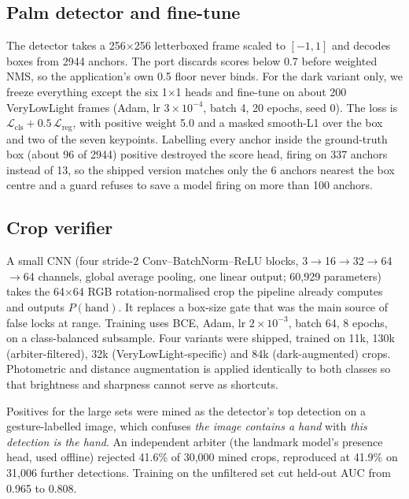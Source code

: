 \documentclass[conference,a4paper]{IEEEtran}
\begin{document}
\subsection{Palm detector and fine-tune}
The detector takes a 256$\times$256 letterboxed frame scaled to $[-1,1]$
and decodes boxes from 2944 anchors. The port discards scores below 0.7
before weighted NMS, so the application's own 0.5 floor never binds. For
the dark variant only, we freeze everything except the six 1$\times$1 heads
and fine-tune on about 200 VeryLowLight frames (Adam, lr $3\times10^{-4}$,
batch 4, 20 epochs, seed 0). The loss is
$\mathcal{L}_{\text{cls}} + 0.5\,\mathcal{L}_{\text{reg}}$, with positive
weight 5.0 and a masked smooth-L1 over the box and two of the seven
keypoints. Labelling every anchor inside the ground-truth box (about 96 of
2944) positive destroyed the score head, firing on 337 anchors instead of
13, so the shipped version matches only the 6 anchors nearest the box centre
and a guard refuses to save a model firing on more than 100 anchors.

\subsection{Crop verifier}
A small CNN (four stride-2 Conv--BatchNorm--ReLU blocks,
3$\to$16$\to$32$\to$64$\to$64 channels, global average pooling, one linear
output; 60,929 parameters) takes the 64$\times$64 RGB rotation-normalised
crop the pipeline already computes and outputs $P(\text{hand})$. It
replaces a box-size gate that was the main source of false locks at range.
Training uses BCE, Adam, lr $2\times10^{-3}$, batch 64, 8 epochs, on a
class-balanced subsample. Four variants were shipped, trained on 11k, 130k
(arbiter-filtered), 32k (VeryLowLight-specific) and 84k (dark-augmented)
crops. Photometric and distance augmentation is applied identically to both
classes so that brightness and sharpness cannot serve as shortcuts.

Positives for the large sets were mined as the detector's top detection on
a gesture-labelled image, which confuses \emph{the image contains a hand}
with \emph{this detection is the hand}. An independent arbiter (the
landmark model's presence head, used offline) rejected 41.6\% of 30,000
mined crops, reproduced at 41.9\% on 31,006 further detections. Training on
the unfiltered set cut held-out AUC from 0.965 to 0.808.
\end{document}
